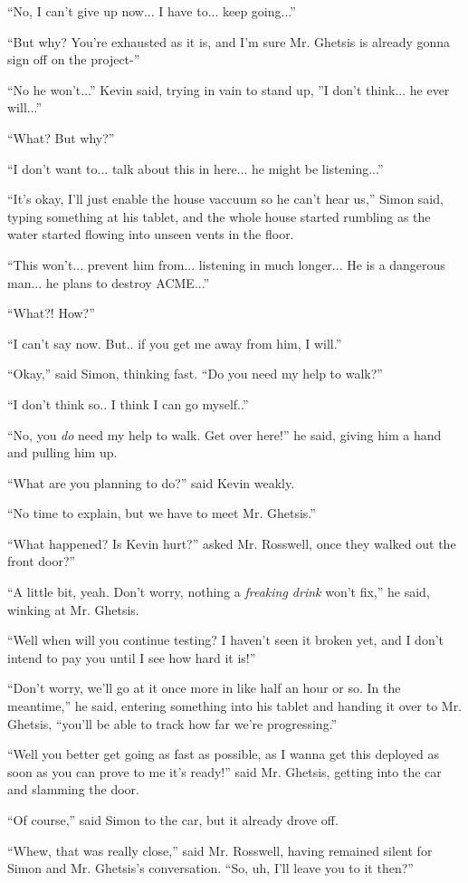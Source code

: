 \documentclass[10pt,a4paper]{article}
\newcommand{\lang}[2]{ #2 \par}
\newcommand{\mainname}{Simon}
\newcommand{\corpnameshort}{ACME}
\newcommand{\ceoname}{Mr. Rosswell}
\newcommand{\policename}{Mr. Ghetsis}
\newcommand{\criminalname}{Kevin}
\begin{document}
\lang{...}{``No, I can't give up now... I have to... keep going...''}
\lang{...}{``But why? You're exhausted as it is, and I'm sure \policename{} is already gonna sign off on the project-''}
\lang{...}{``No he won't...'' \criminalname{} said, trying in vain to stand up, ''I don't think... he ever will...''}
\lang{...}{``What? But why?''}
\lang{...}{``I don't want to... talk about this in here... he might be listening...''}
\lang{...}{``It's okay, I'll just enable the house vaccuum so he can't hear us,'' \mainname{} said, typing something at his tablet, and the whole house started rumbling as the water started flowing into unseen vents in the floor.}
\lang{...}{``This won't... prevent him from... listening in much longer... He is a dangerous man... he plans to destroy \corpnameshort{}...''}
\lang{...}{``What?! How?''}
\lang{...}{``I can't say now. But.. if you get me away from him, I will.''}
\lang{...}{``Okay,'' said \mainname{}, thinking fast. ``Do you need my help to walk?''}
\lang{...}{``I don't think so.. I think I can go myself..''}
\lang{...}{``No, you \emph{do} need my help to walk. Get over here!'' he said, giving him a hand and pulling him up.}
\lang{...}{``What are you planning to do?'' said \criminalname{} weakly.}
\lang{...}{``No time to explain, but we have to meet \policename{}.''}
\lang{...}{``What happened? Is \criminalname{} hurt?'' asked \ceoname{}, once they walked out the front door?''}
\lang{...}{``A little bit, yeah. Don't worry, nothing a \emph{freaking drink} won't fix,'' he said, winking at \policename{}.}
\lang{...}{``Well when will you continue testing? I haven't seen it broken yet, and I don't intend to pay you until I see how hard it is!''}
\lang{...}{``Don't worry, we'll go at it once more in like half an hour or so. In the meantime,'' he said, entering something into his tablet and handing it over to \policename{}, ``you'll be able to track how far we're progressing.''}
\lang{...}{``Well you better get going as fast as possible, as I wanna get this deployed as soon as you can prove to me it's ready!'' said \policename{}, getting into the car and slamming the door.}
\lang{...}{``Of course,'' said \mainname{} to the car, but it already drove off.}
\lang{...}{``Whew, that was really close,'' said \ceoname{}, having remained silent for \mainname{} and \policename{}'s conversation. ``So, uh, I'll leave you to it then?''}

\noindent\makebox[\linewidth]{\rule{\paperwidth}{0.4pt}}
\end{document}
